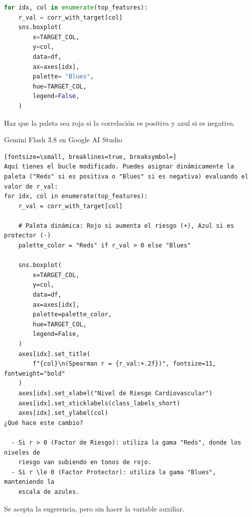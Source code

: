 \documentclass[12pt,a4paper,oneside]{book}
\begin{document}
\begin{iaprompt}
\begin{lstlisting}[language=Python]
for idx, col in enumerate(top_features):
    r_val = corr_with_target[col]
    sns.boxplot(
        x=TARGET_COL,
        y=col,
        data=df,
        ax=axes[idx],
        palette= "Blues",
        hue=TARGET_COL,
        legend=False,
    )
\end{lstlisting}
Haz que la paleta sea roja si la correlación es positiva y azul si es negativa.
\end{iaprompt}
\begin{iaresp}{Gemini Flash 3.8 en Google AI Studio}
\begin{Verbatim}[fontsize=\small, breaklines=true, breaksymbol=]
Aquí tienes el bucle modificado. Puedes asignar dinámicamente la paleta ("Reds" si es positiva o "Blues" si es negativa) evaluando el valor de r_val:
for idx, col in enumerate(top_features):
    r_val = corr_with_target[col]

    # Paleta dinámica: Rojo si aumenta el riesgo (+), Azul si es protector (-)
    palette_color = "Reds" if r_val > 0 else "Blues"

    sns.boxplot(
        x=TARGET_COL,
        y=col,
        data=df,
        ax=axes[idx],
        palette=palette_color,
        hue=TARGET_COL,
        legend=False,
    )
    axes[idx].set_title(
        f"{col}\n(Spearman r = {r_val:+.2f})", fontsize=11, fontweight="bold"
    )
    axes[idx].set_xlabel("Nivel de Riesgo Cardiovascular")
    axes[idx].set_xticklabels(class_labels_short)
    axes[idx].set_ylabel(col)
¿Qué hace este cambio?

  - Si r > 0 (Factor de Riesgo): utiliza la gama "Reds", donde los niveles de
    riesgo van subiendo en tonos de rojo.
  - Si r \le 0 (Factor Protector): utiliza la gama "Blues", manteniendo la
    escala de azules.
\end{Verbatim}
\end{iaresp}
\begin{iaanalisis}
Se acepta la sugerencia, pero sin hacer la variable auxiliar.
\end{iaanalisis}
\end{document}
